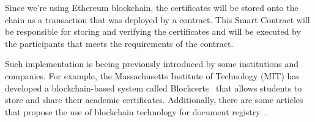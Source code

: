 Since we're using Ethereum blockchain, the certificates will be stored onto the chain as a transaction that was deployed by a contract.
This Smart Contract will be responsible for storing and verifying the certificates and will be executed by the participants that meets the requirements of the contract.

Such implementation is beeing previously introduced by some institutions and companies. For example, the Massachusetts Institute of Technology (MIT) has developed a blockchain-based system called Blockcerts~\cite{blockcerts}
that allows students to store and share their academic certificates. Additionally, there are some articles that propose the use of blockchain technology for document registry~\cite{app112411811, app14020706}.


